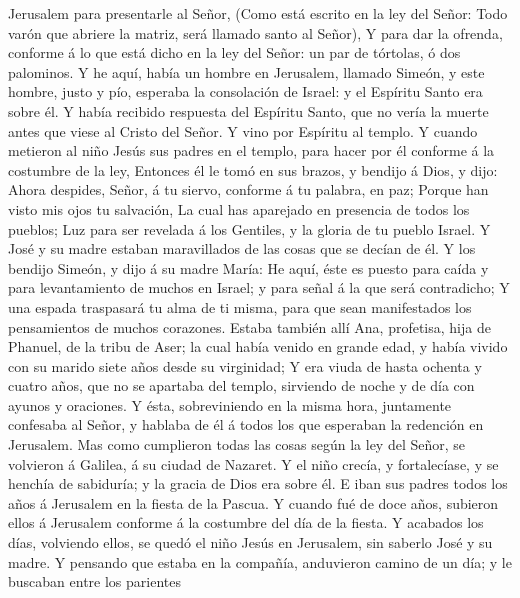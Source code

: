 Jerusalem para presentarle al Señor,  (Como está escrito
en la ley del Señor: Todo varón que abriere la matriz, será llamado
santo al Señor),  Y para dar la ofrenda, conforme á lo
que está dicho en la ley del Señor: un par de tórtolas, ó dos palominos.
 Y he aquí, había un hombre en Jerusalem, llamado Simeón,
y este hombre, justo y pío, esperaba la consolación de Israel: y el
Espíritu Santo era sobre él.  Y había recibido respuesta
del Espíritu Santo, que no vería la muerte antes que viese al Cristo del
Señor.  Y vino por Espíritu al templo. Y cuando metieron
al niño Jesús sus padres en el templo, para hacer por él conforme á la
costumbre de la ley,  Entonces él le tomó en sus brazos,
y bendijo á Dios, y dijo:  Ahora despides, Señor, á tu
siervo, conforme á tu palabra, en paz;  Porque han visto
mis ojos tu salvación,  La cual has aparejado en
presencia de todos los pueblos;  Luz para ser revelada á
los Gentiles, y la gloria de tu pueblo Israel.  Y José y
su madre estaban maravillados de las cosas que se decían de él.
 Y los bendijo Simeón, y dijo á su madre María: He aquí,
éste es puesto para caída y para levantamiento de muchos en Israel; y
para señal á la que será contradicho;  Y una espada
traspasará tu alma de ti misma, para que sean manifestados los
pensamientos de muchos corazones.  Estaba también allí
Ana, profetisa, hija de Phanuel, de la tribu de Aser; la cual había
venido en grande edad, y había vivido con su marido siete años desde su
virginidad;  Y era viuda de hasta ochenta y cuatro años,
que no se apartaba del templo, sirviendo de noche y de día con ayunos y
oraciones.  Y ésta, sobreviniendo en la misma hora,
juntamente confesaba al Señor, y hablaba de él á todos los que esperaban
la redención en Jerusalem.  Mas como cumplieron todas las
cosas según la ley del Señor, se volvieron á Galilea, á su ciudad de
Nazaret.  Y el niño crecía, y fortalecíase, y se henchía
de sabiduría; y la gracia de Dios era sobre él.  E iban
sus padres todos los años á Jerusalem en la fiesta de la Pascua.
 Y cuando fué de doce años, subieron ellos á Jerusalem
conforme á la costumbre del día de la fiesta.  Y acabados
los días, volviendo ellos, se quedó el niño Jesús en Jerusalem, sin
saberlo José y su madre.  Y pensando que estaba en la
compañía, anduvieron camino de un día; y le buscaban entre los parientes
